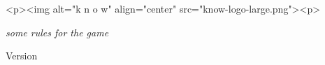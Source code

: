 

  \begin{center}%
    \begin{rawhtml}<p><img alt="k n o w" align="center" src="know-logo-large.png"><p>\end{rawhtml}%
    \begin{large}{\sl some rules for the game}\end{large}%
    \vspace*{1cm}%
    \begin{sc}\kdescr\end{sc}
    \par
    \vspace*{1cm}
    {\small Version \kversion}\\
    \begin{small}\kcopylong\end{small}
  \end{center}%


